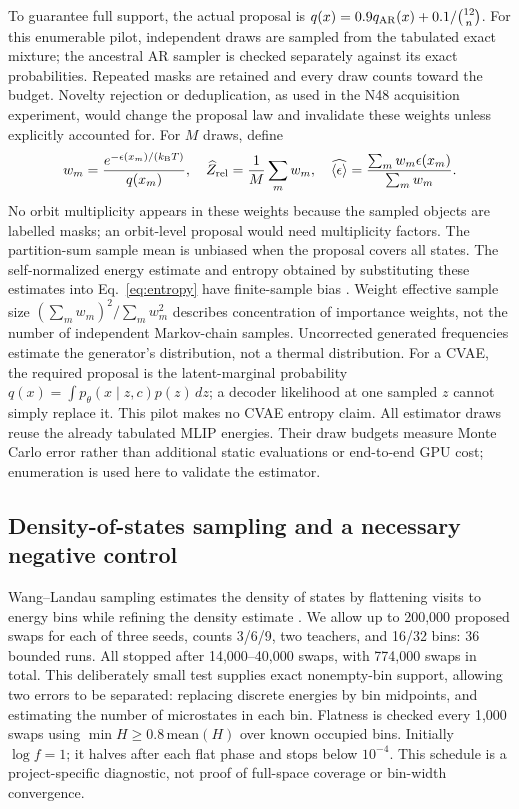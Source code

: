 \documentclass[11pt]{article}
\newcommand{\kb}{k_{\rm B}}
\begin{document}
To guarantee full support, the actual proposal is
$q(x)=0.9q_{\rm AR}(x)+0.1/\binom{12}{n}$. For this enumerable pilot, independent
draws are sampled from the tabulated exact mixture; the ancestral AR sampler
is checked separately against its exact probabilities. Repeated masks are
retained and every draw counts toward the budget. Novelty rejection or
deduplication, as used in the N48 acquisition experiment, would change the
proposal law and invalidate these weights unless explicitly accounted for.
For $M$ draws, define
\begin{equation}
w_m=\frac{e^{-\epsilon(x_m)/(\kb T)}}{q(x_m)},\quad
\widehat Z_{\rm rel}=\frac1M\sum_m w_m,\quad
\widehat{\langle\epsilon\rangle}=\frac{\sum_mw_m\epsilon(x_m)}{\sum_m w_m}.
\end{equation}
No orbit multiplicity appears in these weights because the sampled objects
are labelled masks; an orbit-level proposal would need multiplicity factors.
The partition-sum sample mean is unbiased when the proposal covers all
states. The self-normalized energy estimate and entropy obtained by
substituting these estimates into Eq.~\ref{eq:entropy} have finite-sample
bias \cite{owen}. Weight effective sample size
$(\sum_m w_m)^2/\sum_m w_m^2$ describes concentration of importance weights,
not the number of independent Markov-chain samples. Uncorrected generated
frequencies estimate the generator's distribution, not a thermal distribution.
For a CVAE, the required proposal is the latent-marginal probability
$q(x)=\int p_\theta(x\mid z,c)p(z)\,dz$; a decoder likelihood at one sampled
$z$ cannot simply replace it. This pilot makes no CVAE entropy claim.
All estimator draws reuse the already tabulated MLIP energies. Their draw
budgets measure Monte Carlo error rather than additional static evaluations
or end-to-end GPU cost; enumeration is used here to validate the estimator.

\subsection{Density-of-states sampling and a necessary negative control}
Wang--Landau sampling estimates the density of states by flattening visits to
energy bins while refining the density estimate \cite{wanglandau}. We allow
up to 200,000 proposed swaps for each of three seeds, counts 3/6/9, two teachers,
and 16/32 bins: 36 bounded runs. All stopped after 14,000--40,000 swaps,
with 774,000 swaps in total. This deliberately small test supplies exact
nonempty-bin support, allowing two errors to be separated: replacing discrete
energies by bin midpoints, and estimating the number of microstates in each
bin. Flatness is checked every 1,000 swaps using $\min H\geq0.8\,\mathrm{mean}(H)$
over known occupied bins. Initially $\log f=1$; it halves after each flat
phase and stops below $10^{-4}$. This schedule is a project-specific
diagnostic, not proof of full-space coverage or bin-width convergence.
\end{document}
